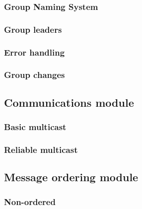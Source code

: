\documentclass[titlepage, twocolumn, a4paper, 10pt]{article}
\begin{document}
\subsubsection{Group Naming System}\label{sec:group-naming-system}

\subsubsection{Group leaders}\label{sec:group-leaders}

\subsubsection{Error handling}\label{sec:error-handling}

\subsubsection{Group changes}\label{sec:group-changes}


\subsection{Communications module}\label{sec:communications-module}
\subsubsection{Basic multicast}\label{sec:basic-multicast}
\subsubsection{Reliable multicast}\label{sec:reliable-multicast}


\subsection{Message ordering module}\label{sec:message-ordering-module}
\subsubsection{Non-ordered}\label{sec:-non-ordered}
\end{document}
